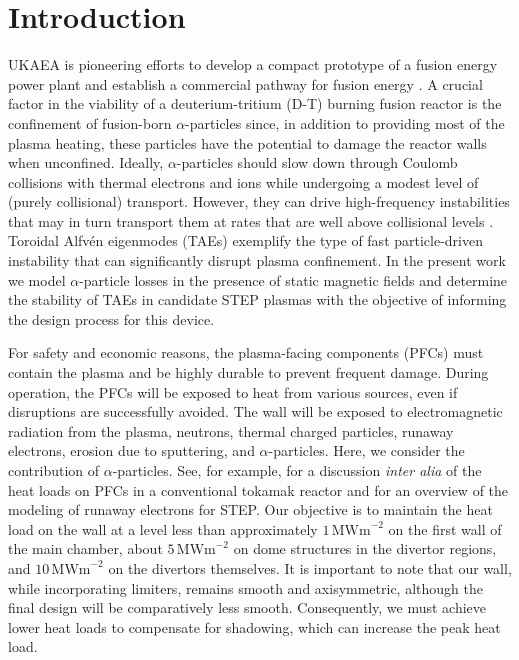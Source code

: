 \documentclass[10pt, a4paper, twoside]{article}
\begin{document}
\setlength{\parindent}{0pt}
\fontsize{10}{13}\selectfont

\section{Introduction}
\label{sec:introduction}

UKAEA is pioneering efforts to develop a compact prototype of a fusion energy power plant and establish a commercial pathway for fusion energy \cite{nuttall2020, meyer2023, mitchell2023}. A crucial factor in the viability of a deuterium-tritium (D-T) burning fusion reactor is the confinement of fusion-born $\alpha$-particles since, in addition to providing most of the plasma heating, these particles have the potential to damage the reactor walls when unconfined. Ideally, $\alpha$-particles should slow down through Coulomb collisions with thermal electrons and ions while undergoing a modest level of (purely collisional) transport. However, they can drive high-frequency instabilities that may in turn transport them at rates that are well above collisional levels \cite{garcia-munoz2011}. Toroidal Alfv\'en eigenmodes (TAEs) exemplify the type of fast particle-driven instability that can significantly disrupt plasma confinement. In the present work we model $\alpha$-particle losses in the presence of static magnetic fields and determine the stability of TAEs in candidate STEP plasmas with the objective of informing the design process for this device.

For safety and economic reasons, the plasma-facing components (PFCs) must contain the plasma and be highly durable to prevent frequent damage. During operation, the PFCs will be exposed to heat from various sources, even if disruptions are successfully avoided. The wall will be exposed to electromagnetic radiation from the plasma, neutrons, thermal charged particles, runaway electrons, erosion due to sputtering, and $\alpha$-particles. Here, we consider the contribution of $\alpha$-particles. See, for example, \cite{bachmann2018} for a discussion {\it inter alia} of the heat loads on PFCs in a conventional tokamak reactor and \cite{fil2023} for an overview of the modeling of runaway electrons for STEP. Our objective is to maintain the heat load on the wall at a level less than approximately $1\, \text{MWm}^{-2}$ on the first wall of the main chamber, about $5\, \text{MWm}^{-2}$ on dome structures in the divertor regions, and $10\, \text{MWm}^{-2}$ on the divertors themselves. It is important to note that our wall, while incorporating limiters, remains smooth and axisymmetric, although the final design will be comparatively less smooth. Consequently, we must achieve lower heat loads to compensate for shadowing, which can increase the peak heat load.
\end{document}
